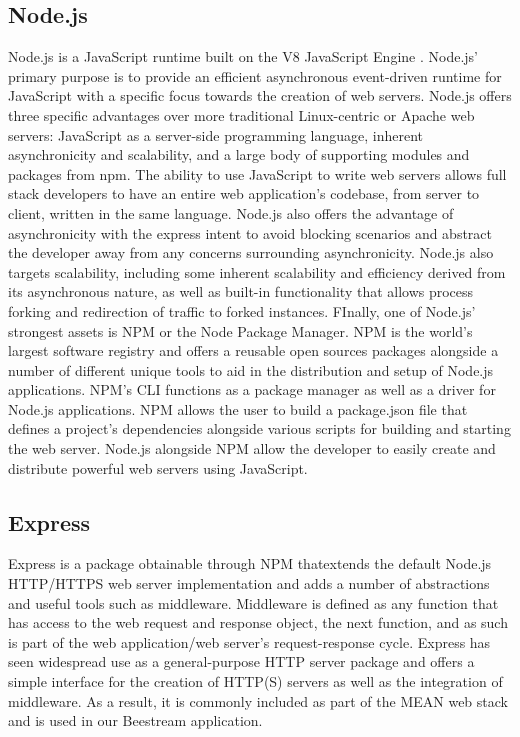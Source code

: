 \subsection{Node.js}
Node.js is a JavaScript runtime built on the V8 JavaScript Engine \cite{node}.  Node.js’ primary purpose is to provide an efficient asynchronous event-driven runtime for JavaScript with a specific focus towards the creation of web servers.  Node.js offers three specific advantages over more traditional Linux-centric or Apache web servers: JavaScript as a server-side programming language, inherent asynchronicity and scalability, and a large body of supporting modules and packages from npm.  The ability to use JavaScript to write web servers allows full stack developers to have an entire web application’s codebase, from server to client, written in the same language.  Node.js also offers the advantage of asynchronicity with the express intent to avoid blocking scenarios and abstract the developer away from any concerns surrounding asynchronicity.  Node.js also targets scalability, including some inherent scalability and  efficiency derived from its asynchronous nature, as well as built-in functionality that allows process forking and redirection of traffic to forked instances.  FInally, one of Node.js’ strongest assets is NPM or the Node Package Manager.  NPM is the world’s largest software registry \cite{npm} and offers a reusable open sources packages alongside a number of different unique tools to aid in the distribution and setup of Node.js applications.  NPM’s CLI functions as a package manager as well as a driver for Node.js applications.  NPM  allows the user to build a package.json file that defines a project’s dependencies alongside various scripts for building and starting the web server.  Node.js alongside NPM allow the developer to easily create and distribute powerful web servers using JavaScript. \par

\subsection{Express}
Express \cite{express} is a package obtainable through NPM thatextends the default Node.js HTTP/HTTPS web server implementation and adds a number of abstractions and useful tools such as middleware.  Middleware is defined as any function that has access to the web request and response object, the next function, and as such is part of the web application/web server’s request-response cycle.  Express has seen widespread use as  a general-purpose HTTP server package and offers a simple interface for the creation of HTTP(S) servers as well as the integration of middleware.  As a result, it is commonly included as part of the MEAN web stack and is used in our Beestream application. \par

